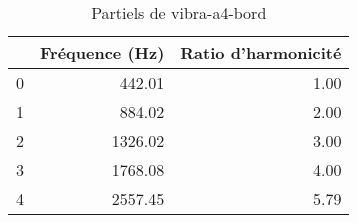 \begin{table}
\centering
\caption{Partiels de vibra-a4-bord}
\label{table:partiels-vibra-a4-bord.wav}
\begin{tabular}{lrr}
\toprule
{} &  Fréquence (Hz) &  Ratio d'harmonicité \\
\midrule
0 &          442.01 &                 1.00 \\
1 &          884.02 &                 2.00 \\
2 &         1326.02 &                 3.00 \\
3 &         1768.08 &                 4.00 \\
4 &         2557.45 &                 5.79 \\
\bottomrule
\end{tabular}
\end{table}
